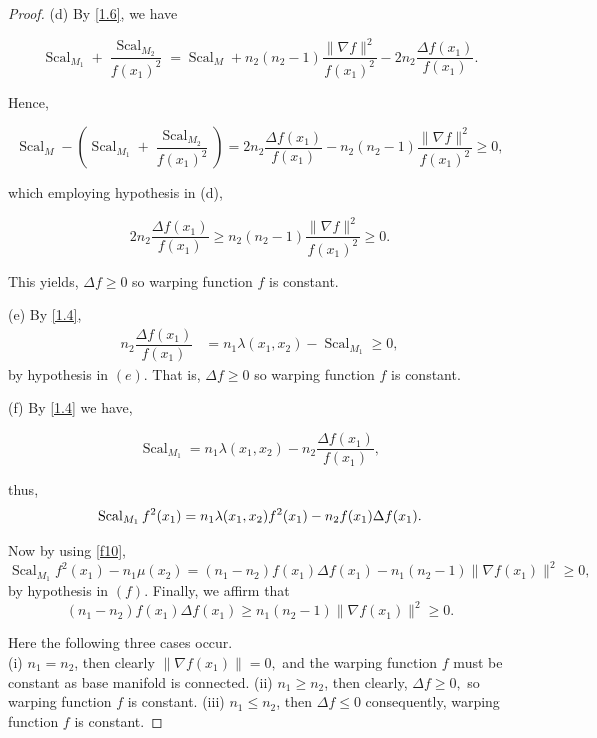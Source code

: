 \documentclass[10pt,a4paper]{amsart}
\begin{document}
\begin{proof}
 {(d)} By \eqref{1.6}, we have
 
 	$$\operatorname{Scal}_{M_1}+\dfrac{\operatorname{Scal}_{M_2}}{f(x_1)^2}=\operatorname{Scal}_M+ n_2(n_2 -1)\dfrac{\|\nabla f\|^2}{f(x_1)^2}-2n_2\frac{\Delta f(x_1)}{f(x_1)}.$$
  
  Hence,
  
 	$$\operatorname{Scal}_M-\left(\operatorname{Scal}_{M_1}+\dfrac{\operatorname{Scal}_{M_2}}{f(x_1)^2}\right)=2n_2\frac{\Delta f(x_1)}{f(x_1)}-n_2(n_2 -1)\dfrac{\|\nabla f\|^2}{f(x_1)^2}\geq 0,$$
  
 which employing hypothesis in (d), 
  
 	$$2n_2\frac{\Delta f(x_1)}{f(x_1)}\geq n_2(n_2 -1)\dfrac{\|\nabla f\|^2}{f(x_1)^2}\geq 0.$$ 

This yields, $\Delta f\geq 0$ so warping function $f$ is constant.\newline

{(e)} By \eqref{1.4}, 
\begin{align*}
	n_2\dfrac{\Delta f(x_1)}{f(x_1)}&= n_1\lambda(x_1,x_2)-\operatorname{Scal}_{M_1}\geq 0,
\end{align*}
by hypothesis in $(e)$.
That is, $\Delta f\geq 0$ so warping function $f$ is constant.\newline

{(f)}
By \eqref{1.4} we have,

		$$\operatorname{Scal}_{M_1} = n_1\lambda(x_1,x_2)- n_2\dfrac{\Delta f(x_1)}{f(x_1)},$$

  thus,
		$$\operatorname{Scal}_{M_1} f^2(x_1) = n_1\lambda(x_1,x_2)f^2(x_1)- n_2f(x_1)\Delta f(x_1).\\$$

Now by using \eqref{f10},
$$\operatorname{Scal}_{M_1}f^2(x_1)-n_1\mu(x_2)=(n_1-n_2)f(x_1)\Delta f(x_1)-n_1(n_2-1)\|\nabla f(x_1)\|^2\geq 0,$$
by hypothesis in $(f)$.
Finally, we affirm that 
$$(n_1-n_2)f(x_1)\Delta f(x_1) \geq n_1(n_2-1)\|\nabla f(x_1)\|^2\geq 0.$$

Here the following three cases occur.\\
{ (i)} $n_1 = n_2$, then clearly 
 $\|\nabla f(x_1)\| = 0,$  and the warping function $f$ must be constant
 as base manifold is connected. \newline
{ (ii)} $n_1 \geq n_2$, then
clearly, $\Delta f \geq  0,$ so warping function $f$ is constant.\newline
{ (iii)} $n_1 \leq n_2$, then 
 $\Delta f \leq 0 $ consequently, warping function $f$ is constant.
\end{proof}
\end{document}
